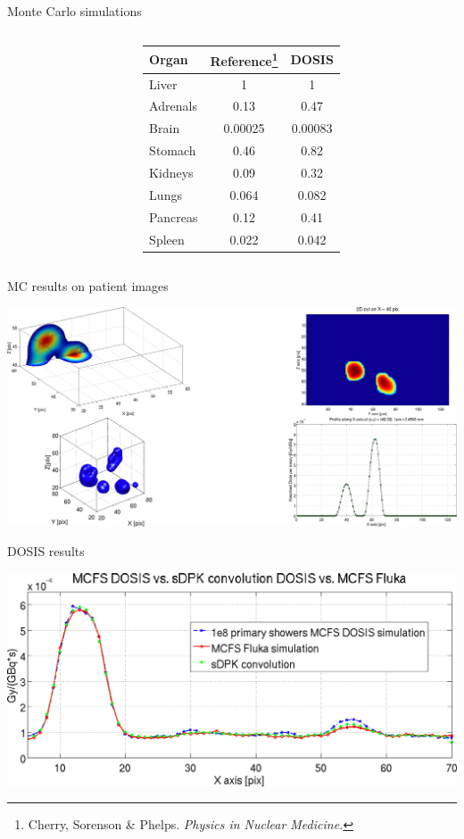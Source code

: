 \documentclass[ignorenonframetext,]{beamer}
\begin{document}
\begin{frame}{Monte Carlo simulations}
\begin{columns}
\begin{column}{.3\textwidth}
\begin{center}
\end{center}
\end{column}
\begin{column}{.7\textwidth}
\begin{center}
\begin{tabular}{l c c}
\hline
Organ & Reference\footnote{Cherry, Sorenson \& Phelps. {\it Physics in Nuclear Medicine.}} & DOSIS \\
\hline
Liver & 1 & 1 \\
Adrenals & 0.13 & 0.47 \\
Brain & 0.00025 & 0.00083 \\
Stomach & 0.46 & 0.82 \\
Kidneys & 0.09 & 0.32 \\
Lungs & 0.064 & 0.082 \\
Pancreas & 0.12 & 0.41 \\
Spleen & 0.022 & 0.042
\end{tabular}
\end{center}
\end{column}
\end{columns}

\end{frame}

\begin{frame}{MC results on patient images}
\protect\hypertarget{mc-results-on-patient-images}{}

\includegraphics{imgs/mc_results.png}

\end{frame}

\begin{frame}{DOSIS results}
\protect\hypertarget{dosis-results}{}

\includegraphics{imgs/dosis_results.png}

\end{frame}
\end{document}
